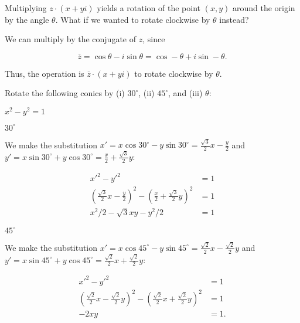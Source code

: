 \documentclass[../gatm_answers.tex]{subfiles}
\begin{document}
\begin{inner_problem}
\item Multiplying $z\cdot(x+yi)$ yields a rotation of the point $(x,y)$ around the origin by the angle $\theta$. What if we wanted to rotate clockwise by $\theta$ instead?
\end{inner_problem}

We can multiply by the conjugate of $z$, since

$$\overline{z}=\cos\theta - i\sin\theta = \cos-\theta + i\sin-\theta.$$

Thus, the operation is $\overline{z}\cdot (x+yi)$ to rotate clockwise by $\theta$.

\begin{outer_problem}
\item Rotate the following conics by (i) $30^\circ$, (ii) $45^\circ$, and (iii) $\theta$:
\end{outer_problem}

\begin{inner_problem}[start=1]
\item $x^2-y^2=1$
\end{inner_problem}

\begin{iinner_problem}[start=1]
\item $30^\circ$
\end{iinner_problem}

We make the substitution $x'=x \cos 30^\circ - y\sin 30^\circ=\frac{\sqrt{3}}{2}x-\frac{y}{2}$ and $y'=x\sin 30^\circ + y\cos 30^\circ=\frac{x}{2}+\frac{\sqrt{3}}{2}y$:

\begin{align*}
x'^2-y'^2&=1 \\
\left(\frac{\sqrt{3}}{2}x-\frac{y}{2}\right)^2 - \left(\frac{x}{2}+\frac{\sqrt{3}}{2}y\right)^2 &= 1 \\
x^2/2 - \sqrt{3} x y - y^2/2 &= 1
\end{align*}

\begin{iinner_problem}
\item $45^\circ$
\end{iinner_problem}

We make the substitution $x'=x \cos 45^\circ - y\sin 45^\circ=\frac{\sqrt{2}}{2}x-\frac{\sqrt{2}}{2}y$ and $y'=x\sin 45^\circ + y\cos 45^\circ=\frac{\sqrt{2}}{2}x+\frac{\sqrt{2}}{2}y$:

\begin{align*}
x'^2-y'^2 &= 1 \\
\left(\frac{\sqrt{2}}{2}x-\frac{\sqrt{2}}{2}y\right)^2 - \left(\frac{\sqrt{2}}{2}x+\frac{\sqrt{2}}{2}y\right)^2 &= 1 \\
-2xy &= 1.
\end{align*}
\end{document}
